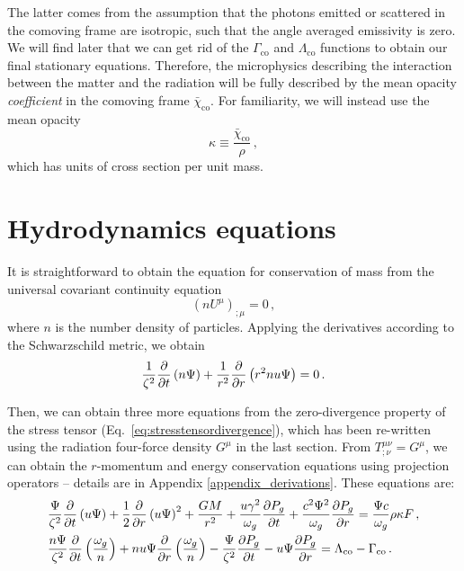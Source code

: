 \documentclass[../main.tex]{subfiles}
\begin{document}
The latter comes from the assumption that the photons emitted or scattered in the comoving frame are isotropic, such that the angle averaged emissivity is zero. We will find later that we can get rid of the $\Gamma_\text{co}$ and $\Lambda_\text{co}$ functions to obtain our final stationary equations.  Therefore, the microphysics describing the interaction between the matter and the radiation will be fully described by the mean opacity \textit{coefficient} in the comoving frame $\bar{\chi}_\text{co}$.  For familiarity, we will instead use the mean opacity
\begin{equation}
    \kappa\equiv \frac{\bar{\chi}_\text{co}}{\rho} \,,
\end{equation}
which has units of cross section per unit mass. 

\section{Hydrodynamics equations}\label{sec:hydrodynamics_eqs}
It is straightforward to obtain the equation for conservation of mass from the universal covariant continuity equation
\begin{equation}
    (nU^\mu)_{;\mu}=0 \,,
\end{equation}
where $n$ is the number density of particles. Applying the derivatives according to the Schwarzschild metric, we obtain
\begin{equation}\label{eq:masscons}
\frac{1}{\zeta^2}\frac{\partial}{\partial t}\left(n\Psi\right)+\frac{1}{r^2}\frac{\partial}{\partial r}\left(r^2n u\Psi\right) = 0 \,.
\end{equation}

Then, we can obtain three more equations from the zero-divergence property of the stress tensor (Eq.~\ref{eq:stresstensordivergence}), which has been re-written using the radiation four-force density $G^\mu$ in the last section. From $T^{\mu\nu}_{;\nu}=G^\mu$, we can obtain the $r$-momentum and energy conservation equations using projection operators -- details are in Appendix \ref{appendix_derivations}.  These equations are: 
\begin{align}
    &\frac{\Psi}{\zeta^2}\frac{\partial}{\partial t}\left(u \Psi\right)+\frac{1}{2}\frac{\partial}{\partial r}\left(u\Psi\right)^2+\frac{GM}{r^2} +\frac{u\gamma^2}{\omega_g}\frac{\partial P_g}{\partial t} +\frac{c^2\Psi^2}{\omega_g}\frac{\partial P_g}{\partial r} = \frac{\Psi c}{\omega_g}\rho\kappa F\label{eq:momcons}\,,\\
    &\frac{n\Psi}{\zeta^2}\frac{\partial}{\partial t}\left(\frac{\omega_g}{n}\right)+n u\Psi\frac{\partial}{\partial r}\left(\frac{\omega_g}{n}\right)-\frac{\Psi}{\zeta^2}\frac{\partial P_g}{\partial t}-u\Psi\frac{\partial P_g}{\partial r}=\Lambda_\text{co}-\Gamma_\text{co}\,.\label{eq:enercons}
\end{align}
\end{document}
